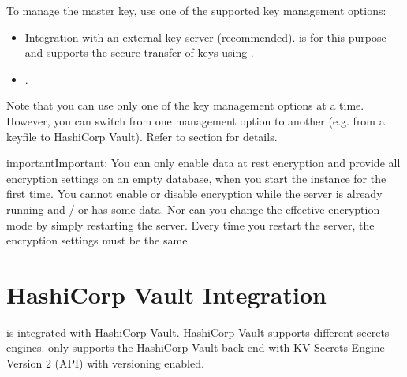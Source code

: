 \documentclass[letterpaper,10pt,english]{sphinxmanual}
\begin{document}
\sphinxAtStartPar
To manage the master key, use one of the supported key management options:
\begin{itemize}
\item {} 
\sphinxAtStartPar
Integration with an external key server (recommended).  is {\hyperref[\detokenize{vault:vault}]{}} for this purpose and supports the secure transfer of keys using {\hyperref[\detokenize{kmip:kmip}]{}}.

\item {} 
\sphinxAtStartPar
{\hyperref[\detokenize{keyfile:keyfile}]{}}.

\end{itemize}

\sphinxAtStartPar
Note that you can use only one of the key management options at a time. However, you can switch from one management option to another (e.g. from a keyfile to HashiCorp Vault). Refer to {\hyperref[\detokenize{encryption-mode-switch:psmdb-encryption-mode-switch}]{}} section for details.

\begin{sphinxadmonition}{important}{Important:}
\sphinxAtStartPar
You can only enable data at rest encryption and provide all encryption settings on an empty database, when you start the  instance for the first time. You cannot enable or disable encryption while the  server is already running and / or has some data. Nor can you change the effective encryption mode by simply restarting the server. Every time you restart the server, the encryption settings must be the same.
\end{sphinxadmonition}


\section{HashiCorp Vault Integration}
\label{\detokenize{vault:vault-integration}}\label{\detokenize{vault:vault}}\label{\detokenize{vault::doc}}
\sphinxAtStartPar
{} is integrated with HashiCorp Vault. HashiCorp Vault supports different secrets engines.  only supports the HashiCorp Vault
back end with KV Secrets Engine \sphinxhyphen{} Version 2 (API)
with versioning enabled.
\end{document}
